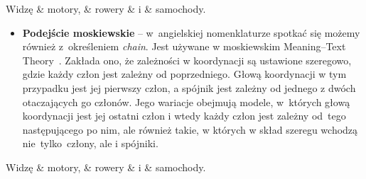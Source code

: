 \documentclass[licencjacka]{pracamgr_Kogni}
\begin{document}
    \begin{exe}
        \ex
        \begin{dependency}[theme = simple, group style = bubble, segmented edge, edge vertical padding=0.5ex, edge unit distance=1.2ex, baseline = 3em]
            \centering
            \begin{deptext}[column sep=1cm]
                Widzę \& motory, \& rowery \& i \& samochody.\\
            \end{deptext}
        \end{dependency}
        \label{ex:stanford}
    \end{exe}
    \begin{itemize}
        \item\textbf{Podejście moskiewskie} -- w~angielskiej nomenklaturze spotkać się możemy również z~określeniem \textit{chain}.
        Jest używane w moskiewskim Meaning--Text Theory~\citep{Melcuk1974, Melcuk1988, Melcuk2009}.
        Zakłada ono, że zależności w koordynacji są ustawione szeregowo, gdzie każdy człon jest zależny od poprzedniego.
        Głową koordynacji w tym przypadku jest jej pierwszy człon, a spójnik jest zależny od jednego z dwóch otaczających go członów.
        Jego wariacje obejmują modele, w~których głową koordynacji jest jej ostatni człon i wtedy każdy człon jest zależny od~tego następującego po nim, ale również takie, w których w skład szeregu wchodzą nie~tylko~człony, ale i spójniki.
    \end{itemize}
    \begin{exe}
        \ex
        \begin{dependency}[theme = simple, group style = bubble, segmented edge, edge vertical padding=0.5ex, edge unit distance=1.2ex, baseline=3em]
            \centering
            \begin{deptext}[column sep=1cm]
                Widzę \& motory, \& rowery \& i \& samochody.\\
            \end{deptext}
        \end{dependency}
        \label{ex:chain}
    \end{exe}
\end{document}
